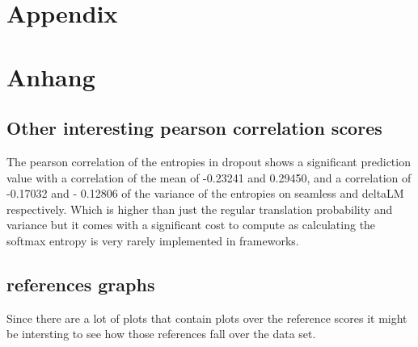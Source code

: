 
{\chapter{Appendix}}    %
{\chapter{Anhang}}      %
\label{chap:appendix}



\section{Other interesting pearson correlation scores}\label{dropout softmax entropy}

The pearson correlation of the entropies in dropout shows a significant prediction value with a correlation of the mean of -0.23241 and 0.29450, and a correlation of -0.17032 and - 0.12806 of the variance of the entropies on seamless and deltaLM respectively. Which is higher than just the regular translation probability and variance but it comes with a significant cost to compute as calculating the softmax entropy is very rarely implemented in frameworks.
\section{references graphs}
\label{sec:appendix:FirstSection}
Since there are a lot of plots that contain plots over the reference scores it might be intersting to see how those references fall over the data set. 

\setcounter{figure}{0}

